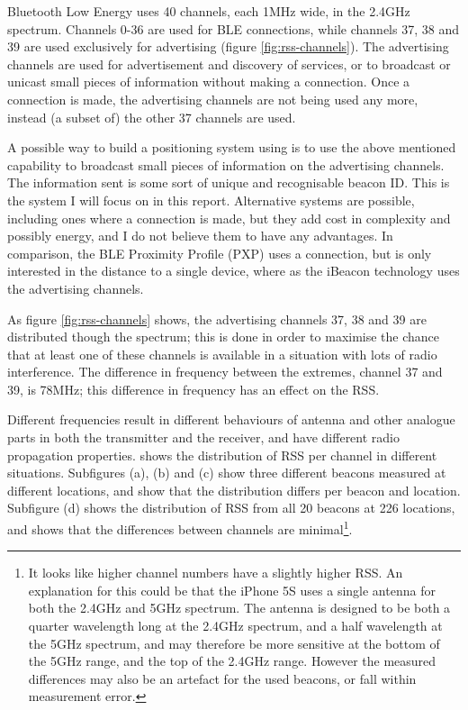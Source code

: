 Bluetooth Low Energy uses 40 channels, each 1MHz wide, in the 2.4GHz spectrum\citep{bluetooth40spec}.
Channels 0-36 are used for BLE connections, while channels 37, 38 and 39 are used exclusively for advertising (figure \ref{fig:rss-channels}).
The advertising channels are used for advertisement and discovery of services, or to broadcast or unicast small pieces of information without making a connection.
Once a connection is made, the advertising channels are not being used any more, instead (a subset of) the other 37 channels are used.

A possible way to build a positioning system using \BLE is to use the above mentioned capability to broadcast small pieces of information on the advertising channels.
The information sent is some sort of unique and recognisable beacon ID.
This is the system I will focus on in this report.
Alternative systems are possible, including ones where a connection is made, but they add cost in complexity and possibly energy, and I do not believe them to have any advantages.
In comparison, the BLE Proximity Profile (PXP) uses a connection, but is only interested in the distance to a single device, where as the iBeacon technology uses the advertising channels.

As figure \ref{fig:rss-channels} shows, the advertising channels 37, 38 and 39 are distributed though the spectrum; this is done in order to maximise the chance that at least one of these channels is available in a situation with lots of radio interference.
The difference in frequency between the extremes, channel 37 and 39, is 78MHz; this difference in frequency has an effect on the RSS.

Different frequencies result in different behaviours of antenna and other analogue parts in both the transmitter and the receiver, and have different radio propagation properties.
 shows the distribution of RSS per channel in different situations.
Subfigures (a), (b) and (c) show three different beacons measured at different locations, and show that the distribution differs per beacon and location.
Subfigure (d) shows the distribution of RSS from all 20 beacons at 226 locations, and shows that the differences between channels are minimal\footnote{It looks like higher channel numbers have a slightly higher RSS.
    An explanation for this could be that the iPhone 5S uses a single antenna for both the 2.4GHz and 5GHz spectrum.
    The antenna is designed to be both a quarter wavelength long at the 2.4GHz spectrum, and a half wavelength at the 5GHz spectrum, and may therefore be more sensitive at the bottom of the 5GHz range, and the top of the 2.4GHz range.
    However the measured differences may also be an artefact for the used beacons, or fall within measurement error.
}.

